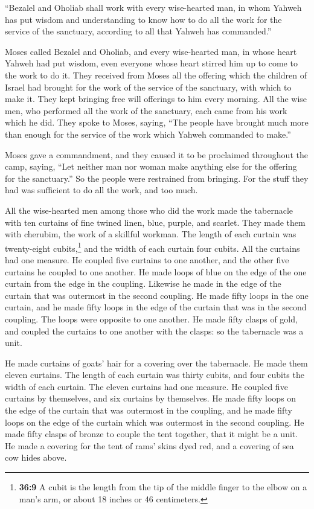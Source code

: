  ``Bezalel and Oholiab shall work with every wise-hearted
man, in whom Yahweh has put wisdom and understanding to know how to do
all the work for the service of the sanctuary, according to all that
Yahweh has commanded.''

 Moses called Bezalel and Oholiab, and every wise-hearted
man, in whose heart Yahweh had put wisdom, even everyone whose heart
stirred him up to come to the work to do it.  They
received from Moses all the offering which the children of Israel had
brought for the work of the service of the sanctuary, with which to make
it. They kept bringing free will offerings to him every morning.
 All the wise men, who performed all the work of the
sanctuary, each came from his work which he did.  They
spoke to Moses, saying, ``The people have brought much more than enough
for the service of the work which Yahweh commanded to make.''

 Moses gave a commandment, and they caused it to be
proclaimed throughout the camp, saying, ``Let neither man nor woman make
anything else for the offering for the sanctuary.'' So the people were
restrained from bringing.  For the stuff they had was
sufficient to do all the work, and too much.

 All the wise-hearted men among those who did the work
made the tabernacle with ten curtains of fine twined linen, blue,
purple, and scarlet. They made them with cherubim, the work of a
skillful workman.  The length of each curtain was
twenty-eight cubits,\footnote{\textbf{36:9} A cubit is the length from
  the tip of the middle finger to the elbow on a man's arm, or about 18
  inches or 46 centimeters.} and the width of each curtain four cubits.
All the curtains had one measure.  He coupled five
curtains to one another, and the other five curtains he coupled to one
another.  He made loops of blue on the edge of the one
curtain from the edge in the coupling. Likewise he made in the edge of
the curtain that was outermost in the second coupling. 
He made fifty loops in the one curtain, and he made fifty loops in the
edge of the curtain that was in the second coupling. The loops were
opposite to one another.  He made fifty clasps of gold,
and coupled the curtains to one another with the clasps: so the
tabernacle was a unit.

 He made curtains of goats' hair for a covering over the
tabernacle. He made them eleven curtains.  The length of
each curtain was thirty cubits, and four cubits the width of each
curtain. The eleven curtains had one measure.  He coupled
five curtains by themselves, and six curtains by themselves.
 He made fifty loops on the edge of the curtain that was
outermost in the coupling, and he made fifty loops on the edge of the
curtain which was outermost in the second coupling.  He
made fifty clasps of bronze to couple the tent together, that it might
be a unit.  He made a covering for the tent of rams'
skins dyed red, and a covering of sea cow hides above.

